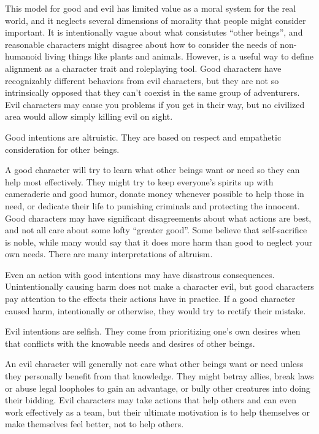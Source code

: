     This model for good and evil has limited value as a moral system for the real world, and it neglects several dimensions of morality that people might consider important.
    It is intentionally vague about what consistutes ``other beings'', and reasonable characters might disagree about how to consider the needs of non-humanoid living things like plants and animals.
    However, is a useful way to define alignment as a character trait and roleplaying tool.
    Good characters have recognizably different behaviors from evil characters, but they are not so intrinsically opposed that they can't coexist in the same group of adventurers.
    Evil characters may cause you problems if you get in their way, but no civilized area would allow simply killing evil on sight.

     Good intentions are altruistic.
    They are based on respect and empathetic consideration for other beings.

    A good character will try to learn what other beings want or need so they can help most effectively.
    They might try to keep everyone's spirits up with cameraderie and good humor, donate money whenever possible to help those in need, or dedicate their life to punishing criminals and protecting the innocent.
    Good characters may have significant disagreements about what actions are best, and not all care about some lofty ``greater good''.
    Some believe that self-sacrifice is noble, while many would say that it does more harm than good to neglect your own needs.
    There are many interpretations of altruism.

    Even an action with good intentions may have disastrous consequences.
    Unintentionally causing harm does not make a character evil, but good characters pay attention to the effects their actions have in practice.
    If a good character caused harm, intentionally or otherwise, they would try to rectify their mistake.

     Evil intentions are selfish.
    They come from prioritizing one's own desires when that conflicts with the knowable needs and desires of other beings.

    An evil character will generally not care what other beings want or need unless they personally benefit from that knowledge.
    They might betray allies, break laws or abuse legal loopholes to gain an advantage, or bully other creatures into doing their bidding.
    Evil characters may take actions that help others and can even work effectively as a team, but their ultimate motivation is to help themselves or make themselves feel better, not to help others.

